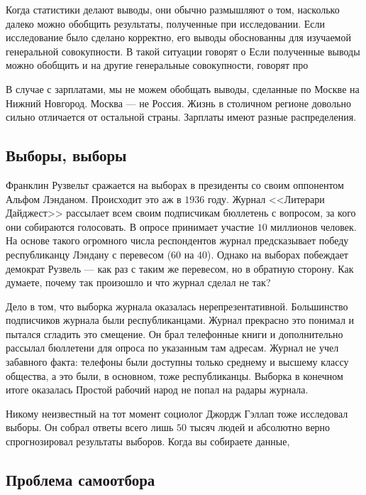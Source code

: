 \documentclass[12pt, a4paper, oneside]{article}
\begin{document}
Когда статистики делают выводы, они обычно размышляют о том, насколько далеко можно обобщить результаты, полученные при исследовании. Если исследование было сделано корректно, его выводы обоснованны для изучаемой генеральной совокупности. В такой ситуации говорят о  Если полученные выводы можно обобщить и на другие генеральные совокупности, говорят про  

В случае с зарплатами, мы не можем обобщать выводы, сделанные по Москве на Нижний Новгород. Москва --- не Россия. Жизнь в столичном регионе довольно сильно отличается от остальной страны. Зарплаты имеют разные распределения. 

\subsection{Выборы, выборы}

Франклин Рузвельт сражается на выборах в президенты со своим оппонентом Альфом Лэнданом. Происходит это аж в $1936$ году. Журнал <<Литерари Дайджест>> рассылает всем своим подписчикам бюллетень с вопросом, за кого они собираются голосовать. В опросе принимает  участие $10$ миллионов человек. На основе такого огромного числа респондентов журнал предсказывает победу республиканцу Лэндану с перевесом ($60$ на $40$). Однако на выборах побеждает демократ Рузвель --- как раз с таким же перевесом,  но в обратную сторону. Как думаете, почему так произошло и что журнал сделал не так? 

Дело в том, что выборка журнала оказалась нерепрезентативной. Большинство подписчиков журнала были республиканцами. Журнал прекрасно это понимал и пытался сгладить это смещение. Он брал телефонные книги и дополнительно рассылал бюллетени для опроса по указанным там адресам. Журнал не учел забавного факта: телефоны были доступны только среднему и высшему классу общества, а это были, в основном, тоже республиканцы. Выборка в конечном итоге оказалась  Простой рабочий народ не попал на радары журнала. 

Никому неизвестный на тот момент социолог Джордж Гэллап тоже исследовал выборы. Он собрал ответы всего лишь $50$ тысяч людей и абсолютно верно спрогнозировал результаты выборов. Когда вы собираете данные, 


\subsection{Проблема самоотбора}
\end{document}

